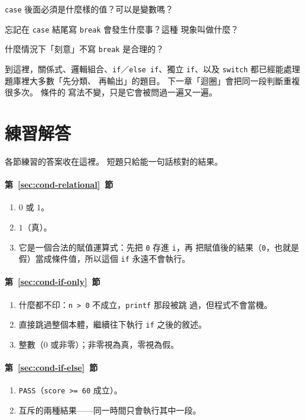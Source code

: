 \begin{drills}[label=drills:cond-switch]
\item \texttt{case} 後面必須是什麼樣的值？可以是變數嗎？
\item 忘記在 \texttt{case} 結尾寫 \texttt{break} 會發生什麼事？這種
現象叫做什麼？
\item 什麼情況下「刻意」不寫 \texttt{break} 是合理的？
\end{drills}

到這裡，關係式、邏輯組合、\texttt{if}／\texttt{else if}、獨立
\texttt{if}、以及 \texttt{switch} 都已經能處理題庫裡大多數「先分類、
再輸出」的題目。 下一章「迴圈」會把同一段判斷重複很多次。 條件的
寫法不變，只是它會被問過一遍又一遍。

\section*{練習解答}

各節練習的答案收在這裡。 短題只給能一句話核對的結果。

\paragraph{第~\ref{sec:cond-relational}~節}
\begin{enumerate}
\item $0$ 或 $1$。
\item $1$（真）。
\item 它是一個合法的賦值運算式：先把 \texttt{0} 存進 \texttt{i}，再
把賦值後的結果（\texttt{0}，也就是假）當成條件值，所以這個 \texttt{if}
永遠不會執行。
\end{enumerate}

\paragraph{第~\ref{sec:cond-if-only}~節}
\begin{enumerate}
\item 什麼都不印：\texttt{n > 0} 不成立，\texttt{printf} 那段被跳
過，但程式不會當機。
\item 直接跳過整個本體，繼續往下執行 \texttt{if} 之後的敘述。
\item 整數（$0$ 或非零）；非零視為真，零視為假。
\end{enumerate}

\paragraph{第~\ref{sec:cond-if-else}~節}
\begin{enumerate}
\item \texttt{PASS}（\texttt{score >= 60} 成立）。
\item 互斥的兩種結果——同一時間只會執行其中一段。
\end{enumerate}

